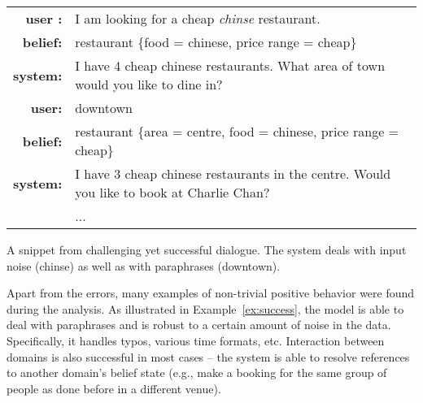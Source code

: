 \documentclass[11pt,a4paper]{article}
\begin{document}
\begin{example}[t]
\small
\setlength{\tabcolsep}{2pt}
\begin{mdframed}[style=ExampleFrame]
\begin{tabularx}{\textwidth}{rX}
\bf user : & I am looking for a cheap \textit{chinse} restaurant. \\
\bf belief: & restaurant \{food = chinese, price range = cheap\} \\
\bf system: & I have 4 cheap chinese restaurants. What area of town would you like to dine in?\\
\bf user: & downtown   \\ 
\bf belief: & restaurant \{area = centre, food = chinese, price range = cheap\} \\
\bf system: & I have 3 cheap chinese restaurants in the centre. Would you like to book at Charlie Chan?\\
 & ... \\

\end{tabularx}
\end{mdframed}
\caption{A snippet from challenging yet successful dialogue. The system deals with input noise (chinse) as well as with paraphrases (downtown). \label{ex:success}}
\end{example}

Apart from the errors, many examples of non-trivial positive behavior were found during the analysis. As illustrated in Example~\ref{ex:success},
the model is able to deal with paraphrases and is robust to a certain amount of noise in the data. Specifically, it handles typos, various time formats, etc.
Interaction between domains is also successful in most cases -- the system is able to resolve references to another domain's belief state (e.g., make a booking for the same group of people as done before in a different venue).
\end{document}
